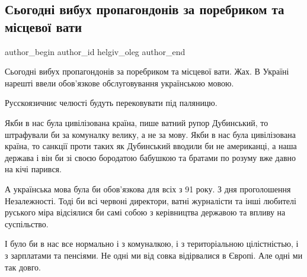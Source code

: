  
 
 
 
 
 
\subsection{Сьогодні вибух пропагондонів за поребриком та місцевої вати}
\label{sec:16_01_2021.fb.helgiv_oleg.1.vata_mova_zakon}
 
\ifcmt
 author_begin
   author_id helgiv_oleg
 author_end
\fi

Сьогодні вибух пропагондонів за поребриком та місцевої вати. Жах. В Україні
нарешті ввели обов'язкове обслуговування українською мовою. 

Русскоязичниє челюсті будуть перековувати під паляницю. 

Якби в нас була цивілізована країна, пише ватний рупор Дубинський, то
штрафували би за комуналку велику, а не за мову. Якби в нас була цивілізована
країна, то санкції проти таких як Дубинський вводили би не американці, а наша
держава і він би зі своєю бородатою бабушкою та братами по розуму вже давно на
кічі парився. 

А українська мова була би обов'язкова для всіх з 91 року. З дня проголошення
Незалежності. Тоді би всі червоні директори, ватні журналісти та інші любителі
руського міра відсіялися би самі собою з керівництва державою та впливу на
суспільство.

І було би в нас все нормально і з комуналкою, і з територіальною цілістністью,
і з зарплатами та пенсіями. Не одні ми від совка відірвалися в Європі. Але одні
ми так довго.

